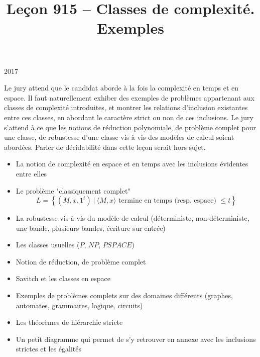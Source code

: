 \documentclass{agregfiche}
\title{Leçon 915 -- Classes de complexité. Exemples}
\begin{document}
\maketitle

\secrapports

\begin{rapport}{2017}

Le jury attend que le candidat aborde à la fois la complexité en temps et en
espace. Il faut naturellement exhiber des exemples de problèmes appartenant aux
classes de complexité introduites, et montrer les relations d’inclusion
existantes entre ces classes, en abordant le caractère strict ou non de ces
inclusions. Le jury s’attend à ce que les notions de réduction polynomiale, de
problème complet pour une classe, de robustesse d’une classe vis à vis des
modèles de calcul soient abordées. Parler de décidabilité dans cette leçon
serait hors sujet.

\end{rapport}

\secindispensables

\begin{itemize}
    \item La notion de complexité en espace et en temps
        avec les inclusions évidentes entre elles
    \item Le problème "classiquement complet"
        \begin{equation}
            L = \left\{ (M, x, 1^t) ~|~ \langle M, x \rangle \text{ termine en
                temps (resp. espace) }\leq t
            \right\}
        \end{equation}
    \item La robustesse vis-à-vis du modèle de calcul 
        (déterministe, non-déterministe, une bande, plusieurs 
        bandes, écriture sur entrée)
    \item Les classes usuelles ($P$, $NP$, $PSPACE$)
    \item Notion de réduction, de problème complet
    \item Savitch et les classes en espace
    \item Exemples de problèmes complets sur des 
        domaines différents (graphes, automates,
        grammaires, logique, circuits)
    \item Les théorèmes de hiérarchie stricte
    \item Un petit diagramme qui permet de s'y retrouver 
        en annexe avec les inclusions strictes et les égalités
\end{itemize}
\end{document}
